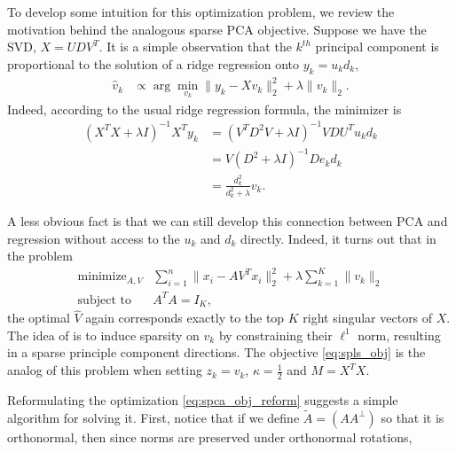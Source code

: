 \documentclass{article}
\begin{document}
To develop some intuition for this optimization problem, we review the
motivation behind the analogous sparse PCA objective. Suppose we have the SVD,
$X = UDV^T$. It is a simple observation that the $k^{th}$ principal component is
proportional to the solution of a ridge regression onto $y_k = u_k d_k$,
\begin{align*}
  \hat{v}_k &\propto \arg \min_{v_k} \|y_k - X v_k\|_2^2 + \lambda \|v_k \|_2.
\end{align*}
Indeed, according to the usual ridge regression formula, the minimizer is
\begin{align*}
  \left(X^TX + \lambda I\right)^{-1} X^T y_k &= \left(V^T D^2 V + \lambda I\right)^{-1} V D U^T u_k d_k \\
  &= V\left(D^2 + \lambda I\right)^{-1} D e_k d_k \\
  &= \frac{d_k^2}{d_k^2 + \lambda}v_k.
\end{align*}

A less obvious fact is that we can still develop this connection between PCA and
regression without access to the $u_k$ and $d_k$ directly. Indeed, it turns out
that in the problem
\begin{align}
  \label{eq:spca_obj_reform}
  \text{minimize}_{A, V} &\sum_{i = 1}^{n} \|x_i - AV^T x_i\|_2^2 +
  \lambda \sum_{k = 1}^{K} \|v_k\|_2 \\
  \text{subject to } &A^T A = I_K, \nonumber
\end{align}
the optimal $\hat{V}$ again corresponds exactly to the top $K$ right singular
vectors of $X$. The idea of \cite{zou2006sparse} is to induce sparsity on $v_k$
by constraining their $\ell^1$ norm, resulting in a sparse principle component
directions. The objective \ref{eq:spls_obj} is the analog of this problem when
setting $z_k = v_k$, $\kappa = \frac{1}{2}$ and $M = X^T X$.

Reformulating the optimization \ref{eq:spca_obj_reform} suggests a simple
algorithm for solving it. First, notice that if we define $\tilde{A} = \left(A
A^{\perp}\right)$ so that it is orthonormal, then since norms are preserved
under orthonormal rotations,
\end{document}
